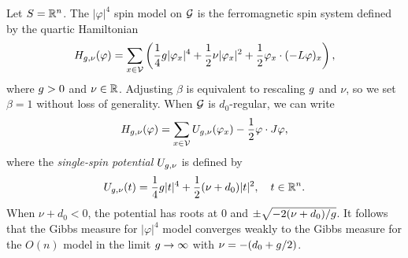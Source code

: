 \begin{example}
Let $S = {\mathbb R}^n$. The $|\varphi|^4$ spin model on $\mathcal{G}$ is the ferromagnetic spin system
defined by the quartic Hamiltonian
\begin{equation}
\label{e:phi4-Ham}
H_{g,\nu}(\varphi)
  =
\sum_{x\in\mathcal{V}}
\left(
  \frac{1}{4} g |\varphi_x|^4
    +
  \frac{1}{2} \nu |\varphi_x|^2
    +
  \frac{1}{2} \varphi_x \cdot (-L \varphi)_x
\right),
\end{equation}
where $g > 0$ and $\nu\in{\mathbb R}$. Adjusting $\beta$ is equivalent to  rescaling
$g$ and $\nu$, so we set $\beta = 1$ without loss of generality.
When $\mathcal{G}$ is $d_0$-regular, we can write
\begin{equation}
H_{g,\nu}(\varphi)
  =
\sum_{x\in\mathcal{V}} U_{g,\nu}(\varphi_x) - \frac{1}{2} \varphi \cdot J \varphi,
\end{equation}
where the \emph{single-spin potential} $U_{g,\nu}$ is defined by
\begin{equation}
U_{g,\nu}(t)
	=
\frac{1}{4} g |t|^4
	+
\frac{1}{2} (\nu + d_0) |t|^2,
	\quad
t \in {\mathbb R}^n.
\end{equation}
When $\nu + d_0 < 0$, the potential has roots at $0$ and $\pm\sqrt{-2 (\nu + d_0) / g}$.
It follows that the Gibbs measure for $|\varphi|^4$ model converges weakly to the
Gibbs measure for the $O(n)$ model in the limit $g\rightarrow\infty$
with $\nu = -(d_0 + g / 2)$.
\end{example}



